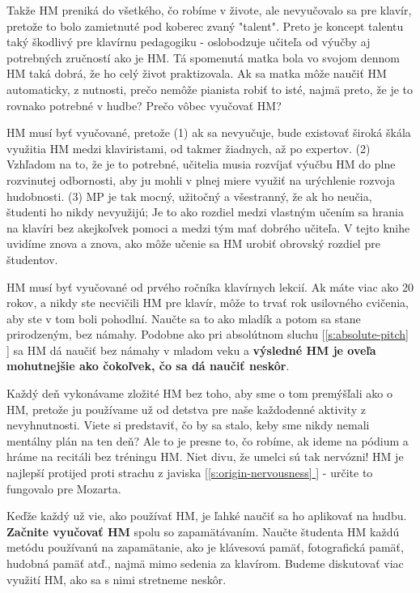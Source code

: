 \documentclass[11pt,a4paper]{book}
\newcommand*{\fullref}[1]{\hyperref[{#1}]{\ref*{#1} \nameref*{#1}}} %
\newcommand*{\fullrefp}[1]{[\fullref{#1}]} %
\begin{document}
Takže HM preniká do všetkého, čo robíme v živote, ale nevyučovalo sa pre klavír, pretože to bolo zamietnuté pod koberec zvaný "talent". Preto je koncept talentu taký škodlivý pre klavírnu pedagogiku - oslobodzuje učiteľa od výučby aj potrebných zručností ako je HM. Tá spomenutá matka bola vo svojom dennom HM taká dobrá, že ho celý život praktizovala. Ak sa matka môže naučiť HM automaticky, z nutnosti, prečo nemôže pianista robiť to isté, najmä preto, že je to rovnako potrebné v hudbe? Prečo vôbec vyučovať HM?

HM musí byť vyučované, pretože (1) ak sa nevyučuje, bude existovať široká škála využitia HM medzi klaviristami, od takmer žiadnych, až po expertov. (2) Vzhľadom na to, že je to potrebné, učitelia musia rozvíjať výučbu HM do plne rozvinutej odbornosti, aby ju mohli v plnej miere využiť na urýchlenie rozvoja hudobnosti. (3) MP je tak mocný, užitočný a všestranný, že ak ho neučia, študenti ho nikdy nevyužijú; Je to ako rozdiel medzi vlastným učením sa hrania na klavíri bez akejkoľvek pomoci a medzi tým mať dobrého učiteľa. V tejto knihe uvidíme znova a znova, ako môže učenie sa HM urobiť obrovský rozdiel pre študentov.

HM musí byť vyučované od prvého ročníka klavírnych lekcií. Ak máte viac ako 20 rokov, a nikdy ste necvičili HM pre klavír, môže to trvať rok usilovného cvičenia, aby ste v tom boli pohodlní. Naučte sa to ako mladík a potom sa stane prirodzeným, bez námahy. Podobne ako pri absolútnom sluchu \fullrefp{s:absolute-pitch} sa HM dá naučiť bez námahy v mladom veku a \textbf{výsledné HM je oveľa mohutnejšie ako čokoľvek, čo sa dá naučiť neskôr}.

Každý deň vykonávame zložité HM bez toho, aby sme o tom premýšľali ako o HM, pretože ju používame už od detstva pre naše každodenné aktivity z nevyhnutnosti. Viete si predstaviť, čo by sa stalo, keby sme nikdy nemali mentálny plán na ten deň? Ale to je presne to, čo robíme, ak ideme na pódium a hráme na recitáli bez tréningu HM. Niet divu, že umelci sú tak nervózni! HM je najlepší protijed proti strachu z javiska \fullrefp{s:origin-nervousness} - určite to fungovalo pre Mozarta.

Keďže každý už vie, ako používať HM, je ľahké naučiť sa ho aplikovať na hudbu. \textbf{Začnite vyučovať HM} spolu so zapamätávaním. Naučte študenta HM každú metódu používanú na zapamätanie, ako je klávesová pamäť, fotografická pamäť, hudobná pamäť atď., najmä mimo sedenia za klavírom. Budeme diskutovať viac využití HM, ako sa s nimi stretneme neskôr.
\end{document}
